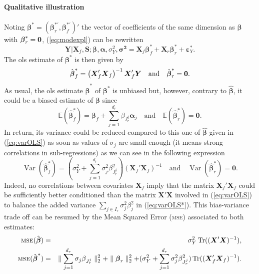 \documentclass[11pt,a4paper]{article}
\begin{document}
\paragraph{Qualitative illustration} Noting $\boldsymbol{\beta}^*=(\boldsymbol{\beta}_r^{*'},\boldsymbol{\beta}_f^{*'})'$ the vector of coefficients of the same dimension as $\boldsymbol{\beta}$ with $\boldsymbol{\beta}_r^*={\bf 0}$, (\ref{eq:modexpl}) can be rewritten
\begin{equation}
	\boldsymbol{Y}{|\boldsymbol{X}_f,\boldsymbol{S}};\boldsymbol{\beta},\boldsymbol{\alpha},\sigma_Y^2,\boldsymbol{\sigma^2}=\boldsymbol{X}_f\boldsymbol{\beta}_f^*+\boldsymbol{X}_r\boldsymbol{\beta}_r^*+\boldsymbol{\varepsilon}_Y^*.\label{eq:modexpl2}
\end{equation}
The {\sc ols} estimate of $\boldsymbol{\beta}^*$ is then given by
	\begin{equation}
		\hat{\boldsymbol{\beta}}^*_f=\left(\boldsymbol{X}_f'\boldsymbol{X}_f \right) ^{-1}\boldsymbol{X}_f'\boldsymbol{Y} \quad \mbox{and} \quad \hat{\boldsymbol{\beta}}^*_r = {\bf 0}.
	\end{equation}
As usual, the {\sc ols} estimate $\hat{\boldsymbol{\beta}}^*$ of $\boldsymbol{\beta}^*$ is unbiased but, however, contrary to $\hat{\boldsymbol{\beta}}$, it could be a biased estimate of $\boldsymbol{\beta}$ since
		\begin{equation}
			\mathbb{E}(\hat{\boldsymbol{\beta}}_f^*)=\boldsymbol{\beta}_f+\sum_{j =1}^{d_r}\beta_{J_r^j}\boldsymbol{\alpha}_j \quad \textrm{and}\quad \mathbb{E}(\hat{\boldsymbol{\beta}}_r^*)=\boldsymbol{0}.
		\end{equation}
In return, its variance could be reduced compared to this one of $\hat{\boldsymbol{\beta}}$ given in (\ref{eq:varOLS}) as soon as values of $\sigma_j$ are small enough (it means strong correlations in sub-regressions) as we can see in the following expression
		\begin{equation}
			\operatorname{Var}(\hat{\boldsymbol{\beta}}_f^*)= (\sigma^2_Y+\sum_{j =1}^{d_r}\sigma^2_{j}\beta_{J_r^j}^2)(\boldsymbol{X}_f' \boldsymbol{X}_f)^{-1} \quad \textrm{and} \quad\operatorname{Var}(\hat{\boldsymbol{\beta}}_r^*)= \boldsymbol{0}. \label{eq:varOLS*}
		\end{equation}
Indeed, no correlations between covariates $\boldsymbol{X}_f$ imply that the matrix $\boldsymbol{X}_f' \boldsymbol{X}_f$ could be sufficiently better conditioned than the matrix $\boldsymbol{X}' \boldsymbol{X}$ involved in (\ref{eq:varOLS}) to balance the added variance $\sum_{j \in I_r}\sigma^2_{j}\beta_{j}^2$ in (\ref{eq:varOLS*}). This bias-variance trade off can be resumed by the Mean Squared Error (\textsc{mse}) associated to both estimates:
	\begin{eqnarray}
			\textsc{mse}(\hat{\boldsymbol{\beta}})&=& \sigma_Y^2 \operatorname{Tr}((\boldsymbol{X}'\boldsymbol{X})^{-1}),
			 \\
			\textsc{mse}(\hat{\boldsymbol{\beta}}^*)&=& \parallel\sum_{j =1}^{d_r}\sigma_{j}\beta_{J_r^j} \parallel_2^2 +\parallel \boldsymbol{\beta}_r\parallel^2_2 + (\sigma^2_Y+\sum_{j =1}^{d_r}\sigma^2_{j}\beta_{J_r^j}^2 ) \operatorname{Tr}((\boldsymbol{X}_f' \boldsymbol{X}_f)^{-1}).
	\end{eqnarray}	 
\end{document}
